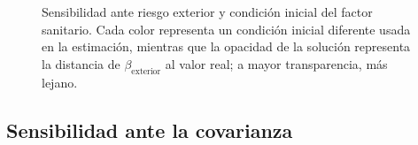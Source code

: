 \begin{figure}[!h]
\caption[Sensibilidad ante riesgo exterior y condición inicial del factor sanitario.]{Sensibilidad ante riesgo exterior y condición inicial del factor sanitario. Cada color representa un condición inicial diferente usada en la estimación, mientras que la opacidad de la solución representa la distancia de \(\beta_{\text{exterior}}\) al valor real; a mayor transparencia, más lejano.} \label{fig:legend-sensi-b}
\end{figure}


\subsection{Sensibilidad ante la covarianza} \label{subsec:sensicov}
